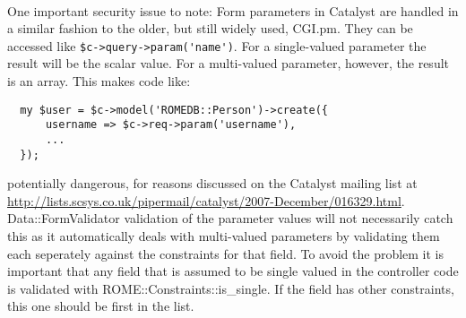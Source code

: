 \paragraph{}
One important security issue to note: Form parameters in Catalyst are handled in a similar fashion to the older, but still widely used, CGI.pm. They can be accessed like \verb|$c->query->param('name')|. For a single-valued parameter the result will be the scalar value. For a multi-valued parameter, however, the result is an array. This makes code like:

\begin{verbatim}
  my $user = $c->model('ROMEDB::Person')->create({ 
      username => $c->req->param('username'), 
      ...
  });
\end{verbatim}

potentially dangerous, for reasons discussed on the Catalyst mailing list at \url{http://lists.scsys.co.uk/pipermail/catalyst/2007-December/016329.html}. Data::FormValidator validation of the parameter values will not necessarily catch this as it automatically deals with multi-valued parameters by validating them each seperately against the constraints for that field. To avoid the problem it is important that any field that is assumed to be single valued in the controller code is validated with ROME::Constraints::is\_single. If the field has other constraints, this one should be first in the list. 
